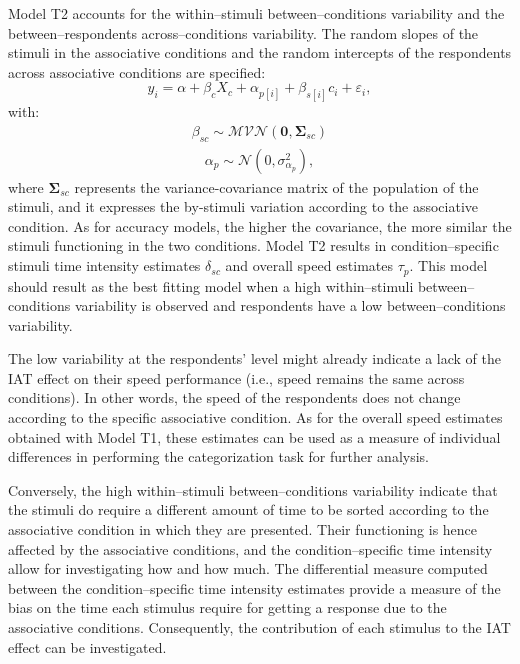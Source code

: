 \documentclass[12pt]{book}
\begin{document}
Model T2 accounts for the within--stimuli between--conditions variability and the between--respondents across--conditions variability. 
The random slopes of the stimuli in the associative conditions and the random intercepts of the respondents across associative conditions are specified:  
\begin{equation}\label{Logtime2}
	y_{i} = \alpha + \beta_cX_c + \alpha_{p[i]} +  \beta_{s[i]}c_{i} + \varepsilon_{i},
\end{equation}
with:
\begin{align}
	\beta_{sc} \sim \mathcal{MVN}(\bm{0}, \bm{\Sigma}_{sc})
\end{align}
\begin{align}
	\alpha_{p} \sim  \mathcal{N} (0, \sigma_{\alpha_p}^2),
\end{align}
where $\bm{\Sigma}_{sc}$ represents the variance-covariance matrix of the population of the stimuli, and it expresses the by-stimuli variation according to the associative condition. As for accuracy models, the higher the covariance, the more similar the stimuli functioning in the two conditions.
Model T2 results in condition--specific stimuli time intensity estimates $\delta_{sc}$ and overall speed estimates $\tau_{p}$. This model should result as the best fitting model when a high within--stimuli between--conditions variability is observed and respondents have a low between--conditions variability. 

The low variability at the respondents' level might already indicate a lack of the IAT effect on their speed performance (i.e., speed remains the same across conditions). In other words, the speed of the respondents does not change according to the specific associative condition. As for the overall speed estimates obtained with Model T1, these estimates can be used as a measure of individual differences in performing the categorization task for further analysis.

Conversely, the high within--stimuli between--conditions variability indicate that the stimuli do require a different amount of time to be sorted according to the associative condition in which they are presented. Their functioning is hence affected by the associative conditions, and the condition--specific time intensity allow for investigating how and how much. 
The differential measure computed between the condition--specific time intensity estimates provide a measure of the bias on the time each stimulus require for getting a response due to the associative conditions. Consequently, the contribution of each stimulus to the IAT effect can be investigated. 
\end{document}
